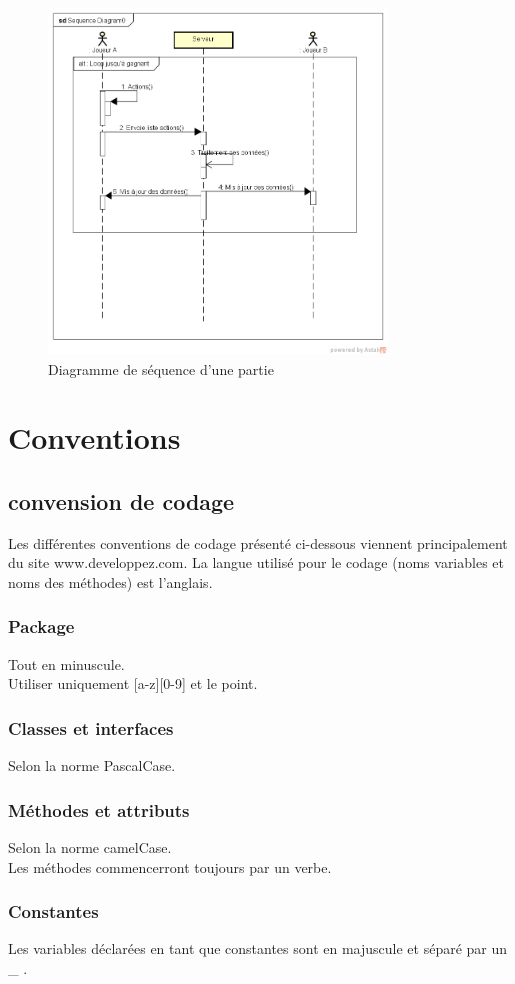 \documentclass{report}
\begin{document}
\begin{figure}[ht]
	\centering\includegraphics[width=9cm]{SequenceJeu}
	\caption{Diagramme de séquence d'une partie}
	\label{diagramme-sequence-jeu}
\end{figure}
\chapter{Conventions}
\section{convension de codage}
Les différentes conventions de codage présenté ci-dessous viennent principalement du site www.developpez.com.
La langue utilisé pour le codage (noms variables et noms des méthodes)  est l'anglais.
\subsection{Package}
Tout en minuscule. \\
Utiliser uniquement [a-z][0-9] et le point.
\subsection{Classes et interfaces}
Selon la norme PascalCase.
\subsection{Méthodes et attributs}
Selon la norme camelCase. \\
Les méthodes commencerront toujours par un verbe.
\subsection{Constantes}
Les variables déclarées en tant que constantes sont en majuscule et séparé par un \og \_ \fg{}.
\end{document}
